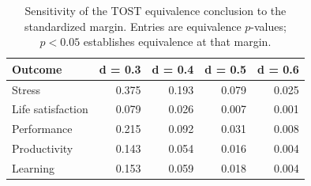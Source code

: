 \begin{table}

\caption{\label{tab:TOST-sensitivity}Sensitivity of the TOST equivalence conclusion to the standardized margin. Entries are equivalence $p$-values; $p<0.05$ establishes equivalence at that margin.}
\centering
\begin{tabular}[t]{lrrrr}
\toprule
Outcome & d = 0.3 & d = 0.4 & d = 0.5 & d = 0.6\\
\midrule
Stress & 0.375 & 0.193 & 0.079 & 0.025\\
Life satisfaction & 0.079 & 0.026 & 0.007 & 0.001\\
Performance & 0.215 & 0.092 & 0.031 & 0.008\\
Productivity & 0.143 & 0.054 & 0.016 & 0.004\\
Learning & 0.153 & 0.059 & 0.018 & 0.004\\
\bottomrule
\end{tabular}
\end{table}
